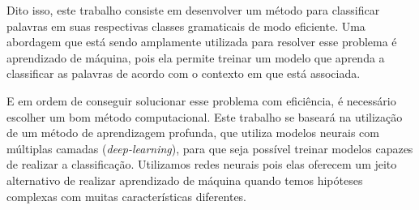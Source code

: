 Dito isso, este trabalho consiste em desenvolver um método para classificar palavras em suas respectivas classes gramaticais de modo eficiente. Uma abordagem que está sendo amplamente utilizada para resolver esse problema é aprendizado de máquina, pois ela permite treinar um modelo que aprenda a classificar as palavras de acordo com o contexto em que está associada. 

E em ordem de conseguir solucionar esse problema com eficiência, é necessário escolher um bom método computacional. Este trabalho se baseará na utilização de um método de aprendizagem profunda, que utiliza modelos neurais com múltiplas camadas (\textit{deep-learning}), para que seja possível treinar modelos capazes de realizar a classificação. Utilizamos redes neurais pois elas oferecem um jeito alternativo de realizar aprendizado de máquina quando temos hipóteses complexas com muitas características diferentes. 

